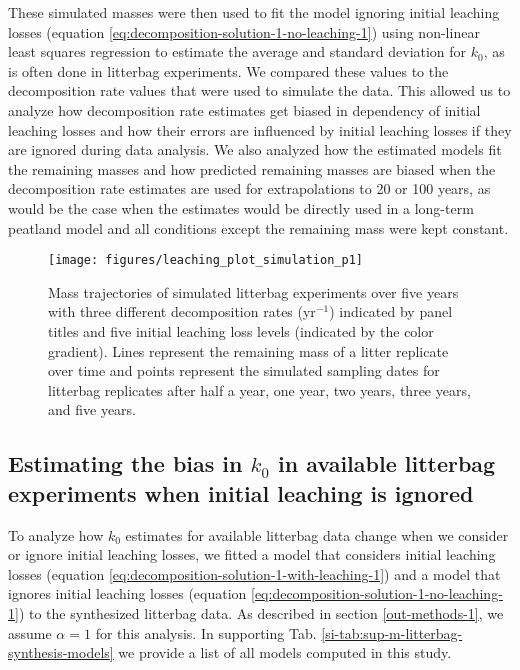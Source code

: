 \documentclass[bg, manuscript]{copernicus}
\begin{document}
These simulated masses were then used to fit the model ignoring initial leaching losses (equation \eqref{eq:decomposition-solution-1-no-leaching-1}) using non-linear least squares regression to estimate the average and standard deviation for \(k_0\), as is often done in litterbag experiments. We compared these values to the decomposition rate values that were used to simulate the data. This allowed us to analyze how decomposition rate estimates get biased in dependency of initial leaching losses and how their errors are influenced by initial leaching losses if they are ignored during data analysis. We also analyzed how the estimated models fit the remaining masses and how predicted remaining masses are biased when the decomposition rate estimates are used for extrapolations to 20 or 100 years, as would be the case when the estimates would be directly used in a long-term peatland model and all conditions except the remaining mass were kept constant.



\begin{figure}[H]

{\centering \texttt{[image: figures/leaching\_plot\_simulation\_p1]} 

}

\caption{Mass trajectories of simulated litterbag experiments over five years with three different decomposition rates (yr\(^{-1}\)) indicated by panel titles and five initial leaching loss levels (indicated by the color gradient). Lines represent the remaining mass of a litter replicate over time and points represent the simulated sampling dates for litterbag replicates after half a year, one year, two years, three years, and five years.}\label{fig:out-simulation-p1}
\end{figure}

\hypertarget{methods-bias-real-1}{%
\subsection{\texorpdfstring{Estimating the bias in \(k_0\) in available litterbag experiments when initial leaching is ignored}{Estimating the bias in k\_0 in available litterbag experiments when initial leaching is ignored}}\label{methods-bias-real-1}}

To analyze how \(k_0\) estimates for available litterbag data change when we consider or ignore initial leaching losses, we fitted a model that considers initial leaching losses (equation \eqref{eq:decomposition-solution-1-with-leaching-1}) and a model that ignores initial leaching losses (equation \eqref{eq:decomposition-solution-1-no-leaching-1}) to the synthesized litterbag data. As described in section \ref{out-methods-1}, we assume \(\alpha=1\) for this analysis. In supporting Tab. \ref{si-tab:sup-m-litterbag-synthesis-models} we provide a list of all models computed in this study.
\end{document}
